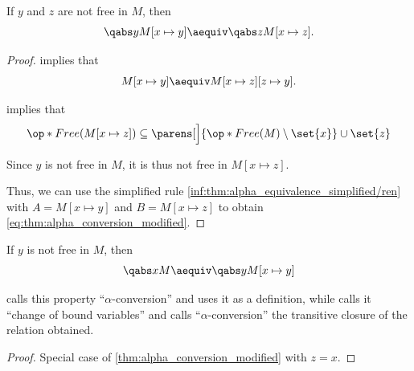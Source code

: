 \begin{corollary}\label{thm:alpha_conversion_modified}
  If \( y \) and \( z \) are not free in \( M \), then
  \begin{equation}\label{eq:thm:alpha_conversion_modified}
    \qabs y M[x \mapsto y] \aequiv \qabs z M[x \mapsto z].
  \end{equation}
\end{corollary}
\begin{proof}
   implies that
  \begin{equation*}
    M[x \mapsto y] \aequiv M[x \mapsto z][z \mapsto y].
  \end{equation*}

   implies that
  \begin{equation*}
    \op*{Free}(M[x \mapsto z]) \subseteq \parens[\Big]{ \op*{Free}(M) \setminus \set{ x } } \cup \set{ z }
  \end{equation*}

  Since \( y \) is not free in \( M \), it is thus not free in \( M[x \mapsto z] \).

  Thus, we can use the simplified rule \ref{inf:thm:alpha_equivalence_simplified/ren} with \( A = M[x \mapsto y] \) and \( B = M[x \mapsto z] \) to obtain \eqref{eq:thm:alpha_conversion_modified}.
\end{proof}

\begin{corollary}\label{thm:alpha_conversion}
  If \( y \) is not free in \( M \), then
  \begin{equation}\label{eq:thm:alpha_conversion}
    \qabs x M \aequiv \qabs y M[x \mapsto y]
  \end{equation}
\end{corollary}
\begin{comments}
  \item \Textcite[\S 2.1.11]{Barendregt1984LambdaCalculus} calls this property \enquote{\( \alpha \)-conversion} and uses it as a definition, while \textcite[def. 1A8]{Hindley1997BasicSTT} calls it \enquote{change of bound variables} and calls \enquote{\( \alpha \)-conversion} the transitive closure of the relation obtained.
\end{comments}
\begin{proof}
  Special case of \cref{thm:alpha_conversion_modified} with \( z = x \).
\end{proof}

